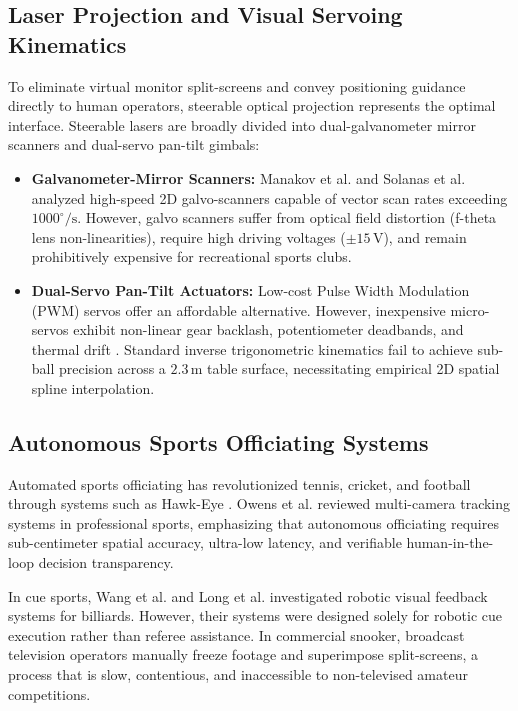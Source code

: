 \subsection{Laser Projection and Visual Servoing Kinematics}
To eliminate virtual monitor split-screens and convey positioning guidance directly to human operators, steerable optical projection represents the optimal interface. Steerable lasers are broadly divided into dual-galvanometer mirror scanners and dual-servo pan-tilt gimbals:
\begin{itemize}
    \item \textbf{Galvanometer-Mirror Scanners:} Manakov et al. \cite{ref17} and Solanas et al. \cite{ref18} analyzed high-speed 2D galvo-scanners capable of vector scan rates exceeding $1000^\circ/\text{s}$. However, galvo scanners suffer from optical field distortion (f-theta lens non-linearities), require high driving voltages ($\pm 15\,\text{V}$), and remain prohibitively expensive for recreational sports clubs.
    \item \textbf{Dual-Servo Pan-Tilt Actuators:} Low-cost Pulse Width Modulation (PWM) servos offer an affordable alternative. However, inexpensive micro-servos exhibit non-linear gear backlash, potentiometer deadbands, and thermal drift \cite{ref36, ref37}. Standard inverse trigonometric kinematics fail to achieve sub-ball precision across a $2.3\,\text{m}$ table surface, necessitating empirical 2D spatial spline interpolation.
\end{itemize}

\subsection{Autonomous Sports Officiating Systems}
Automated sports officiating has revolutionized tennis, cricket, and football through systems such as Hawk-Eye \cite{ref22}. Owens et al. \cite{ref22} reviewed multi-camera tracking systems in professional sports, emphasizing that autonomous officiating requires sub-centimeter spatial accuracy, ultra-low latency, and verifiable human-in-the-loop decision transparency.

In cue sports, Wang et al. \cite{ref23} and Long et al. \cite{ref24} investigated robotic visual feedback systems for billiards. However, their systems were designed solely for robotic cue execution rather than referee assistance. In commercial snooker, broadcast television operators manually freeze footage and superimpose split-screens, a process that is slow, contentious, and inaccessible to non-televised amateur competitions.

